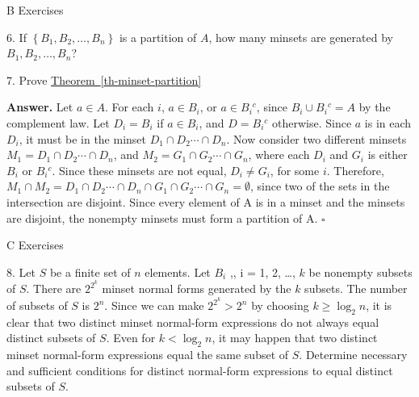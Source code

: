 \documentclass[10pt,]{book}
\theoremstyle{plain}
\theoremstyle{definition}
\theoremstyle{definition}
\theoremstyle{definition}
\begin{document}
\par\smallskip\noindent
\hypertarget{exercisegroup-6}{}\typeout{************************************************}
\typeout{************************************************}
B Exercises%
\begin{exercisegroup}
\item[6.]\hypertarget{exercise-17}{}  If \(\left\{B_1, B_2, \ldots , B_n\right\}\) is a partition of \(A\), how many minsets are generated by \(B_1, B_2, \ldots , B_n\)?%
\par\smallskip
\item[7.]\hypertarget{exercise-18}{}  Prove \hyperref[th-minset-partition]{Theorem~\ref{th-minset-partition}}%
\par\smallskip
\par\smallskip
\noindent\textbf{Answer.}\hypertarget{answer-9}{}\quad
 Let \(a\in A\). For each \(i\), \(a\in B_i\), or \(a\in B_i{}^c\), since \(B_i\cup B_i{}^c=A\) by the complement law. Let \(D_i=B_i\) if \(a\in B_i\), and \(D=B_i{}^c\) otherwise. Since \(a\) is in each \(D_i\), it must be in the minset \(D_1\cap  D_2 \cdots \cap D_n\). Now consider two different minsets \(M_1= D_1\cap D_2\cdots \cap D_n\), and \(M_2=G_1\cap G_2\cdots \cap G_n\), where each \(D_i\) and \(G_i\) is either \(B_i\) or \(B_i{}^c\). Since these minsets are not equal, \(D_i\neq G_i\), for some \(i\). Therefore, \(M_1\cap M_2=D_1\cap  D_2 \cdots \cap D_n\cap G_1\cap G_2\cdots \cap G_n=\emptyset\), since two of the sets in the intersection are disjoint. Since every element of A is in a minset and the minsets are disjoint, the nonempty minsets must form a partition of A. \(\square\)%
\end{exercisegroup}
\par\smallskip\noindent
\hypertarget{exercisegroup-7}{}\typeout{************************************************}
\typeout{************************************************}
C Exercises%
\begin{exercisegroup}
\item[8.]\hypertarget{exercise-19}{} Let \(S\) be a finite set of \(n\) elements. Let \(B_i\) ,, i = 1, 2, \ldots  , \(k\) be nonempty subsets of \(S\). There are \(2^{2^k}\) minset normal forms generated by the \(k\) subsets. The number of subsets of \(S\) is \(2^n\). Since we can make \(2^{2^k} > 2^n\) by choosing \(k \geq  \log _2 n\), it is clear that two distinct minset normal-form expressions do not always equal distinct subsets of \(S\). Even for \(k < \log _2 n\), it may happen that two distinct minset normal-form expressions equal the same subset of \(S\).
Determine necessary and sufficient conditions for distinct normal-form expressions to equal distinct subsets of \(S\).%
\par\smallskip
\end{exercisegroup}
\par\smallskip\noindent
\typeout{************************************************}
\typeout{************************************************}
\end{document}
